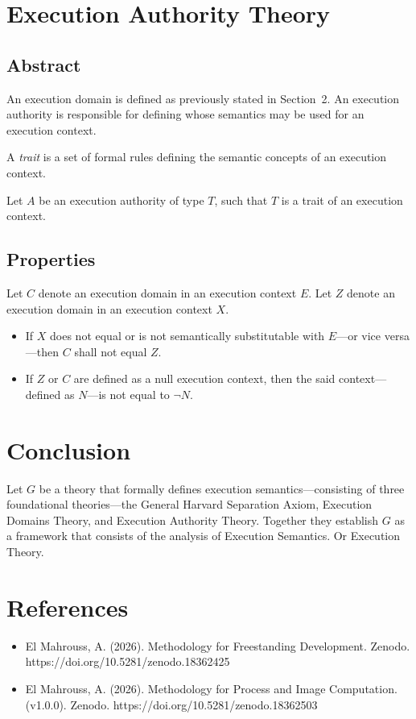 \documentclass[11pt,a4paper]{article}
\begin{document}
\section{Execution Authority Theory}

\subsection{Abstract}

An execution domain is defined as previously stated in Section~2. An execution authority is responsible for defining whose semantics may be used for an execution context.

A \emph{trait} is a set of formal rules defining the semantic concepts of an execution context.

Let $A$ be an execution authority of type $T$, such that $T$ is a trait of an execution context.

\subsection{Properties}

Let $C$ denote an execution domain in an execution context $E$. Let $Z$ denote an execution domain in an execution context $X$.

\begin{itemize}
    \item If $X$ does not equal or is not semantically substitutable with $E$—or vice versa—then $C$ shall not equal $Z$.
    \item If $Z$ or $C$ are defined as a null execution context, then the said context—defined as $N$—is not equal to $\lnot N$.
\end{itemize}

\section{Conclusion}

Let $G$ be a theory that formally defines execution semantics—consisting of three foundational theories—the General Harvard Separation Axiom, Execution Domains Theory, and Execution Authority Theory. Together they establish $G$ as a framework that consists of the analysis of Execution Semantics. Or Execution Theory.

\section{References}

\begin{itemize}
	\item El Mahrouss, A. (2026). Methodology for Freestanding Development. Zenodo. https://doi.org/10.5281/zenodo.18362425
	
	\item El Mahrouss, A. (2026). Methodology for Process and Image Computation. (v1.0.0). Zenodo. https://doi.org/10.5281/zenodo.18362503
\end{itemize}
\end{document}
